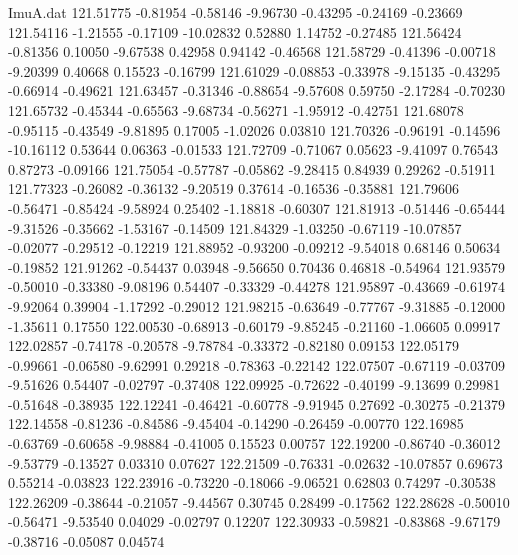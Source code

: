\begin{filecontents}{ImuA.dat}
 121.51775   -0.81954   -0.58146   -9.96730   -0.43295   -0.24169   -0.23669
 121.54116   -1.21555   -0.17109  -10.02832    0.52880    1.14752   -0.27485
 121.56424   -0.81356    0.10050   -9.67538    0.42958    0.94142   -0.46568
 121.58729   -0.41396   -0.00718   -9.20399    0.40668    0.15523   -0.16799
 121.61029   -0.08853   -0.33978   -9.15135   -0.43295   -0.66914   -0.49621
 121.63457   -0.31346   -0.88654   -9.57608    0.59750   -2.17284   -0.70230
 121.65732   -0.45344   -0.65563   -9.68734   -0.56271   -1.95912   -0.42751
 121.68078   -0.95115   -0.43549   -9.81895    0.17005   -1.02026    0.03810
 121.70326   -0.96191   -0.14596  -10.16112    0.53644    0.06363   -0.01533
 121.72709   -0.71067    0.05623   -9.41097    0.76543    0.87273   -0.09166
 121.75054   -0.57787   -0.05862   -9.28415    0.84939    0.29262   -0.51911
 121.77323   -0.26082   -0.36132   -9.20519    0.37614   -0.16536   -0.35881
 121.79606   -0.56471   -0.85424   -9.58924    0.25402   -1.18818   -0.60307
 121.81913   -0.51446   -0.65444   -9.31526   -0.35662   -1.53167   -0.14509
 121.84329   -1.03250   -0.67119  -10.07857   -0.02077   -0.29512   -0.12219
 121.88952   -0.93200   -0.09212   -9.54018    0.68146    0.50634   -0.19852
 121.91262   -0.54437    0.03948   -9.56650    0.70436    0.46818   -0.54964
 121.93579   -0.50010   -0.33380   -9.08196    0.54407   -0.33329   -0.44278
 121.95897   -0.43669   -0.61974   -9.92064    0.39904   -1.17292   -0.29012
 121.98215   -0.63649   -0.77767   -9.31885   -0.12000   -1.35611    0.17550
 122.00530   -0.68913   -0.60179   -9.85245   -0.21160   -1.06605    0.09917
 122.02857   -0.74178   -0.20578   -9.78784   -0.33372   -0.82180    0.09153
 122.05179   -0.99661   -0.06580   -9.62991    0.29218   -0.78363   -0.22142
 122.07507   -0.67119   -0.03709   -9.51626    0.54407   -0.02797   -0.37408
 122.09925   -0.72622   -0.40199   -9.13699    0.29981   -0.51648   -0.38935
 122.12241   -0.46421   -0.60778   -9.91945    0.27692   -0.30275   -0.21379
 122.14558   -0.81236   -0.84586   -9.45404   -0.14290   -0.26459   -0.00770
 122.16985   -0.63769   -0.60658   -9.98884   -0.41005    0.15523    0.00757
 122.19200   -0.86740   -0.36012   -9.53779   -0.13527    0.03310    0.07627
 122.21509   -0.76331   -0.02632  -10.07857    0.69673    0.55214   -0.03823
 122.23916   -0.73220   -0.18066   -9.06521    0.62803    0.74297   -0.30538
 122.26209   -0.38644   -0.21057   -9.44567    0.30745    0.28499   -0.17562
 122.28628   -0.50010   -0.56471   -9.53540    0.04029   -0.02797    0.12207
 122.30933   -0.59821   -0.83868   -9.67179   -0.38716   -0.05087    0.04574

\end{filecontents}
